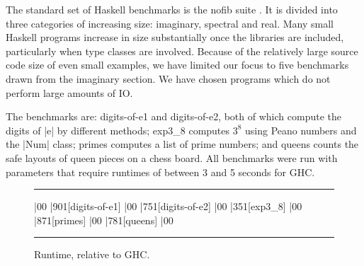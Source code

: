 \documentclass{llncs}
\newenvironment{fig}
    {\begin{figure}[tbp]\hrule}
    {\end{figure}}
\newcommand{\figend}{\hrule}
\begin{document}
The standard set of Haskell benchmarks is the nofib suite \cite{nofib}. It is divided into three categories of increasing size: imaginary, spectral and real. Many small Haskell programs increase in size substantially once the libraries are included, particularly when type classes are involved. Because of the relatively large source code size of even small examples, we have limited our focus to five benchmarks drawn from the imaginary section. We have chosen programs which do not perform large amounts of IO.

The benchmarks are: digits-of-e1 and digits-of-e2, both of which compute the digits of |e| by different methods; exp3\_8 computes $3^8$ using Peano numbers and the |Num| class; primes computes a list of prime numbers; and queens counts the safe layouts of queen pieces on a chess board. All benchmarks were run with parameters that require runtimes of between 3 and 5 seconds for GHC.

\begin{fig}
\vspace{7mm}
\begin{barenv}
 
\bar{0}{0}
\bar{90}{1}[digits-of-e1]
\bar{0}{0}
\bar{75}{1}[digits-of-e2]
\bar{0}{0}
\bar{35}{1}[exp3\_8]
\bar{0}{0}
\bar{87}{1}[primes]
\bar{0}{0}
\bar{78}{1}[queens]
\bar{0}{0}
\end{barenv}
\vspace{3mm}
\figend
\caption{Runtime, relative to GHC.}
\label{fig:haskell_results}
\end{fig}
\end{document}
